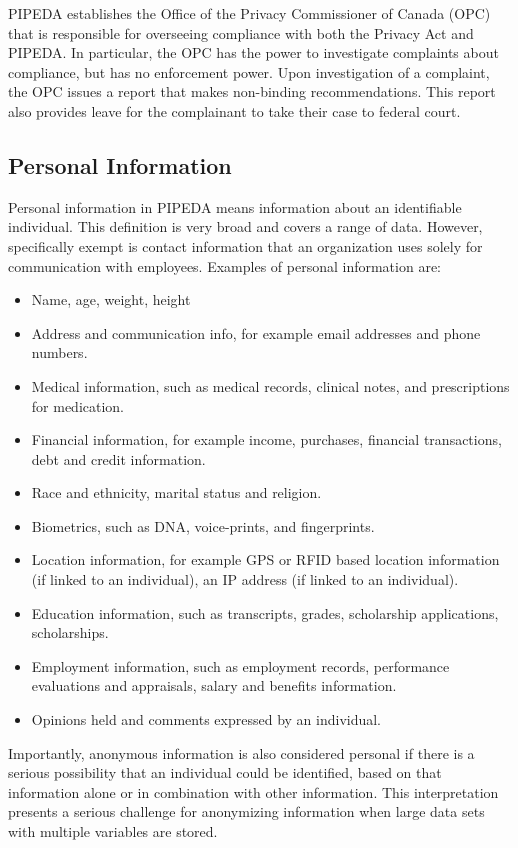 PIPEDA establishes the Office of the Privacy Commissioner of Canada (OPC) that is responsible for overseeing compliance with both the Privacy Act and PIPEDA. In particular, the OPC has the power to investigate complaints about compliance, but has no enforcement power. Upon investigation of a complaint, the OPC issues a report that makes non-binding recommendations. This report also provides leave for the complainant to take their case to federal court. 

\subsection*{Personal Information}

Personal information in PIPEDA means information about an identifiable individual. This definition is very broad and covers a range of data. However, specifically exempt is contact information that an organization uses solely for communication with employees. Examples of personal information are:

\begin{itemize}
   \item Name, age, weight, height
   \item Address and communication info, for example email addresses and phone numbers.
   \item Medical information, such as medical records, clinical notes, and prescriptions for medication.
   \item Financial information, for example income, purchases, financial transactions, debt and credit information.
   \item Race and ethnicity, marital status and religion.
   \item Biometrics, such as DNA, voice-prints, and fingerprints.
   \item Location information, for example GPS or RFID based location information (if linked to an individual), an IP address (if linked to an individual).
   \item Education information, such as transcripts, grades, scholarship applications, scholarships.
   \item Employment information, such as employment records, performance evaluations and appraisals, salary and benefits information.
   \item Opinions held and comments expressed by an individual.
\end{itemize} 

Importantly, anonymous information is also considered personal if there is a serious possibility that an individual could be identified, based on that information alone or in combination with other information. This interpretation presents a serious challenge for anonymizing information when large data sets with multiple variables are stored.

